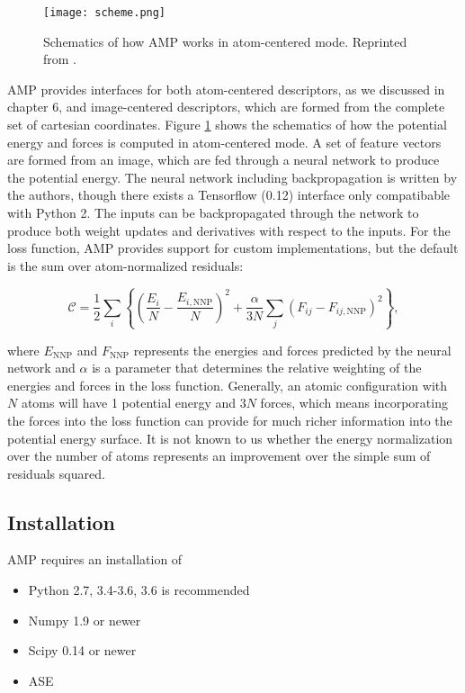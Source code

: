 \begin{figure}[H]
\centering
\texttt{[image: scheme.png]}
\caption{Schematics of how AMP works in atom-centered mode.
    Reprinted from \parencite[AMP paper]{khorshidi2016amp}.}
\label{fig:scheme}
\end{figure}

AMP provides interfaces for both atom-centered descriptors, as we
discussed in chapter 6, and image-centered descriptors,
which are formed from the complete set of cartesian coordinates.
Figure \ref{fig:scheme} shows the schematics of how the
potential energy and forces is computed in atom-centered mode.
A set of feature vectors are formed from an image, which are fed
through a neural network to produce the potential energy.
The neural network including backpropagation is written by the
authors, though there exists a Tensorflow (0.12) interface
only compatibable with Python 2.
The inputs can be backpropagated through the network
to produce both weight updates and derivatives with respect to
the inputs.
For the loss function, AMP provides support for custom implementations,
but the default is the sum over atom-normalized residuals:

\begin{equation}
    \mathcal{C} = \frac{1}{2} \sum_{i} \left\{
        \left(\frac{E_i}{N} - \frac{E_{i, \text{NNP}}}{N}\right)^2 +
        \frac{\alpha}{3N} \sum_{j} \left(F_{ij} - F_{ij, \text{NNP}}
        \right)^2 \right\},
\end{equation}

where $E_{\text{NNP}}$ and $F_{\text{NNP}}$ 
represents the energies and forces predicted
by the neural network and
$\alpha$ is a parameter that determines the relative weighting
of the energies and forces in the loss function.
Generally, an atomic configuration with $N$ atoms will have 1 potential
energy and $3N$ forces, which means incorporating the forces into
the loss function can provide for much richer information into
the potential energy surface.
It is not known to us whether the energy normalization over the number of atoms
represents an improvement over the simple sum of residuals squared.

\subsection{Installation}
AMP requires an installation of

\begin{itemize}
    \item Python 2.7, 3.4-3.6, 3.6 is recommended
    \item Numpy 1.9 or newer
    \item Scipy 0.14 or newer
    \item ASE
\end{itemize}

